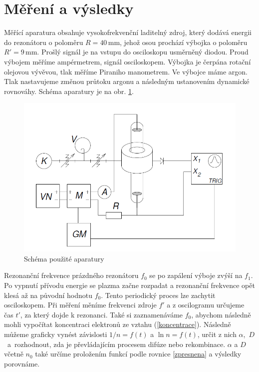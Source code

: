 \documentclass[a4paper,12pt]{article}
\begin{document}
\section{Měření a výsledky}
Měřící aparatura obsahuje vysokofrekvenční laditelný zdroj, který dodává energii do rezonátoru o poloměru $R = 40\,\si{\milli\meter}$, jehož osou prochází výbojka o poloměru $R' = 9\,\si{\milli\meter}$. Prošlý signál je na vstupu do osciloskopu usměrněný diodou. Proud výbojem měříme ampérmetrem, signál osciloskopem. Výbojka je čerpána rotační olejovou vývěvou, tlak měříme Piraniho manometrem. Ve výbojce máme argon. Tlak nastavujeme změnou průtoku argonu a následným ustanovením dynamické rovnováhy. Schéma aparatury je na obr. \ref{schema}.

\begin{figure}[h]
	\centering
	\includegraphics[width=130mm]{schema.png}
	\caption{Schéma použité aparatury}
	\label{schema}
\end{figure}

\newpage
Rezonanční frekvence prázdného rezonátoru $f_0$ se po zapálení výboje zvýší na 
$f_1$. Po vypnutí přívodu energie se plazma začne rozpadat a rezonanční 
frekvence opět klesá až na původní hodnotu $f_0$. Tento periodický proces lze 
zachytit osciloskopem. Při měření měníme frekvenci zdroje $f'$ a z oscilogramu 
určujeme čas $t'$, za který dojde k rezonanci. Také si zaznamenáváme $f_0$, 
abychom následně mohli vypočítat koncentraci elektronů ze vztahu (\ref{koncentrace}). 
Následně můžeme graficky vynést závislosti $1/n = f(t)$ a $\ln n = f(t)$, 
určit z nich $\alpha$,~$D$~a~rozhodnout, zda je převládajícím procesem difúze 
nebo rekombinace. $\alpha$ a $D$ včetně $n_0$ také určíme proložením funkcí 
podle rovnice \eqref{zpresnena} a výsledky porovnáme.
\end{document}
